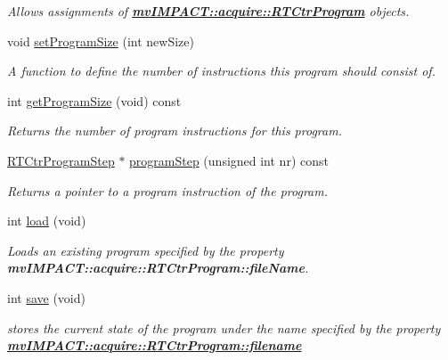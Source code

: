 \begin{DoxyCompactItemize}
\begin{DoxyCompactList}\small\item\em Allows assignments of {\bfseries \hyperlink{classmv_i_m_p_a_c_t_1_1acquire_1_1_r_t_ctr_program}{mv\+I\+M\+P\+A\+C\+T\+::acquire\+::\+R\+T\+Ctr\+Program}} objects. \end{DoxyCompactList}\item 
void \hyperlink{classmv_i_m_p_a_c_t_1_1acquire_1_1_r_t_ctr_program_a285318f623f43356a98a9c816fb12393}{set\+Program\+Size} (int new\+Size)
\begin{DoxyCompactList}\small\item\em A function to define the number of instructions this program should consist of. \end{DoxyCompactList}\item 
int \hyperlink{classmv_i_m_p_a_c_t_1_1acquire_1_1_r_t_ctr_program_a996c3b454f02e3dc3e84b3fc9142e946}{get\+Program\+Size} (void) const 
\begin{DoxyCompactList}\small\item\em Returns the number of program instructions for this program. \end{DoxyCompactList}\item 
\hyperlink{classmv_i_m_p_a_c_t_1_1acquire_1_1_r_t_ctr_program_step}{R\+T\+Ctr\+Program\+Step} $\ast$ \hyperlink{classmv_i_m_p_a_c_t_1_1acquire_1_1_r_t_ctr_program_ad15489b2d15c594dd44f01d4f515c97f}{program\+Step} (unsigned int nr) const 
\begin{DoxyCompactList}\small\item\em Returns a pointer to a program instruction of the program. \end{DoxyCompactList}\item 
int \hyperlink{classmv_i_m_p_a_c_t_1_1acquire_1_1_r_t_ctr_program_a349cc9c552585fe4d795b7655d9b3bde}{load} (void)
\begin{DoxyCompactList}\small\item\em Loads an existing program specified by the property {\bfseries mv\+I\+M\+P\+A\+C\+T\+::acquire\+::\+R\+T\+Ctr\+Program\+::file\+Name}. \end{DoxyCompactList}\item 
int \hyperlink{classmv_i_m_p_a_c_t_1_1acquire_1_1_r_t_ctr_program_a937c09b17d8343c2f7f3142abeeb836f}{save} (void)
\begin{DoxyCompactList}\small\item\em stores the current state of the program under the name specified by the property {\bfseries \hyperlink{classmv_i_m_p_a_c_t_1_1acquire_1_1_r_t_ctr_program_ab43275f87f5032016f0ec4dfba643343}{mv\+I\+M\+P\+A\+C\+T\+::acquire\+::\+R\+T\+Ctr\+Program\+::filename}} \end{DoxyCompactList}\end{DoxyCompactItemize}
